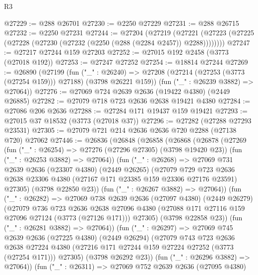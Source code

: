 \begin{lexlean}{R3}
\begin{coremodule}
@27229 := @288 @26701
@27230 := @2250 @27229
@27231 := @288 @26715
@27232 := @2250 @27231
@27244 := @27204
    (@27219
      (@27221 (@27223 (@27225 (@27228 (@27230 (@27232 (@2250 (@288 (@2284 @2457)) @2288))))))))
@27247 := @27217 @27244 @159 @27203
@27252 := @27015 @192 @2458 (@3773 (@27018 @192))
@27253 := @27247 @27252
@27254 := @18814 @27244
@27269 := @26890
    (@27199
      (fun ("_" : @26240) =>
      @27208 (@27214 (@27253 (@3773 (@27254 @159))) @27188) (@3798 @26221 @159))
      (fun ("_" : @26239 @3882) => @27064))
@27276 := @27069 @724 @2639 @2636 (@19422 @4380) (@2449 @26885)
@27282 := @27079 @718 @723 @2636 @2638 @19421 @4380
@27284 := @27086 @206 @2636
@27288 := @27284 @171 @19437 @159 @19421
@27293 := @27015 @37 @18532 (@3773 (@27018 @37))
@27296 := @27282 (@27288 @27293 @23531)
@27305 := @27079 @721 @214 @2636 @2636 @720 @2288 (@27138 @720) @27062
@27446 := @26836
    (@26848
      (@26858
        (@26868
          (@26878
            (@27269
              (fun ("_" : @26254) => @27276 (@27296 @27305) (@3798 @19420 @23))
              (fun ("_" : @26253 @3882) => @27064))
            (fun ("_" : @26268) =>
            @27069
              @731
              @2639
              @2636
              (@23307 @4380)
              (@2449 @26265)
              (@27079
                @729
                @723
                @2636
                @2638
                @23306
                @4380
                (@27167 @171 @23385 @159 @23306 @27176 @23591)
                @27305)
              (@3798 @22850 @23))
            (fun ("_" : @26267 @3882) => @27064))
          (fun ("_" : @26282) =>
          @27069
            @738
            @2639
            @2636
            (@27097 @4380)
            (@2449 @26279)
            (@27079
              @736
              @723
              @2636
              @2638
              @27096
              @4380
              (@27088 @171 @27116 @159 @27096 @27124 (@3773 (@27126 @171)))
              @27305)
            (@3798 @22858 @23))
          (fun ("_" : @26281 @3882) => @27064))
        (fun ("_" : @26297) =>
        @27069
          @745
          @2639
          @2636
          (@27225 @4380)
          (@2449 @26294)
          (@27079
            @743
            @723
            @2636
            @2638
            @27224
            @4380
            (@27216 @171 @27244 @159 @27224 @27252 (@3773 (@27254 @171)))
            @27305)
          (@3798 @26292 @23))
        (fun ("_" : @26296 @3882) => @27064))
      (fun ("_" : @26311) =>
      @27069
        @752
        @2639
        @2636
        (@27095 @4380)

\end{coremodule}
\end{lexlean}
